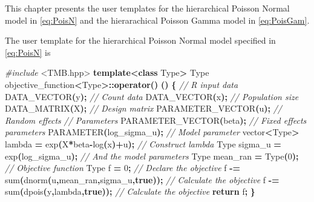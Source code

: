 \documentclass[a4paper,twoside,11pt]{report} %
\newenvironment{Shaded}{\begin{snugshade}}{\end{snugshade}}
\newcommand{\CommentTok}[1]{\textcolor[rgb]{0.56,0.35,0.01}{\textit{#1}}}
\newcommand{\ControlFlowTok}[1]{\textcolor[rgb]{0.13,0.29,0.53}{\textbf{#1}}}
\newcommand{\DecValTok}[1]{\textcolor[rgb]{0.00,0.00,0.81}{#1}}
\newcommand{\ImportTok}[1]{#1}
\newcommand{\KeywordTok}[1]{\textcolor[rgb]{0.13,0.29,0.53}{\textbf{#1}}}
\newcommand{\NormalTok}[1]{#1}
\newcommand{\OperatorTok}[1]{\textcolor[rgb]{0.81,0.36,0.00}{\textbf{#1}}}
\newcommand{\PreprocessorTok}[1]{\textcolor[rgb]{0.56,0.35,0.01}{\textit{#1}}}
\theoremstyle{definition}
\theoremstyle{definition}
\theoremstyle{definition}
\theoremstyle{definition}
\theoremstyle{remark}
\begin{document}
This chapter presents the user templates for the hierarchical Poisson Normal model in \eqref{eq:PoisN} and the hierarachical Poisson Gamma model in \eqref{eq:PoisGam}.

The user template for the hierarchical Poisson Normal model specified in \eqref{eq:PoisN} is

\begin{Shaded}
\begin{Highlighting}[]
\PreprocessorTok{\#include }\ImportTok{\textless{}TMB.hpp\textgreater{}}
\KeywordTok{template}\OperatorTok{\textless{}}\KeywordTok{class}\NormalTok{ Type}\OperatorTok{\textgreater{}}
\NormalTok{Type objective\_function}\OperatorTok{\textless{}}\NormalTok{Type}\OperatorTok{\textgreater{}::}\KeywordTok{operator}\OperatorTok{()} \OperatorTok{()}
\OperatorTok{\{}
  \CommentTok{// R input data}
\NormalTok{  DATA\_VECTOR}\OperatorTok{(}\NormalTok{y}\OperatorTok{);}                               \CommentTok{// Count data}
\NormalTok{  DATA\_VECTOR}\OperatorTok{(}\NormalTok{x}\OperatorTok{);}                               \CommentTok{// Population size}
\NormalTok{  DATA\_MATRIX}\OperatorTok{(}\NormalTok{X}\OperatorTok{);}                               \CommentTok{// Design matrix}
\NormalTok{  PARAMETER\_VECTOR}\OperatorTok{(}\NormalTok{u}\OperatorTok{);}                          \CommentTok{// Random effects}
  \CommentTok{// Parameters}
\NormalTok{  PARAMETER\_VECTOR}\OperatorTok{(}\NormalTok{beta}\OperatorTok{);}                       \CommentTok{// Fixed effects parameters}
\NormalTok{  PARAMETER}\OperatorTok{(}\NormalTok{log\_sigma\_u}\OperatorTok{);}                       \CommentTok{// Model parameter}
\NormalTok{  vector}\OperatorTok{\textless{}}\NormalTok{Type}\OperatorTok{\textgreater{}}\NormalTok{ lambda  }\OperatorTok{=}\NormalTok{ exp}\OperatorTok{(}\NormalTok{X}\OperatorTok{*}\NormalTok{beta}\OperatorTok{{-}}\NormalTok{log}\OperatorTok{(}\NormalTok{x}\OperatorTok{)+}\NormalTok{u}\OperatorTok{);}  \CommentTok{// Construct \textquotesingle{}lambda\textquotesingle{}}
\NormalTok{  Type sigma\_u }\OperatorTok{=}\NormalTok{ exp}\OperatorTok{(}\NormalTok{log\_sigma\_u}\OperatorTok{);}              \CommentTok{// And the model parameters}
\NormalTok{  Type mean\_ran }\OperatorTok{=}\NormalTok{ Type}\OperatorTok{(}\DecValTok{0}\OperatorTok{);}
  \CommentTok{// Objective function}
\NormalTok{  Type f }\OperatorTok{=} \DecValTok{0}\OperatorTok{;}                                   \CommentTok{// Declare the objective}
\NormalTok{  f }\OperatorTok{{-}=}\NormalTok{ sum}\OperatorTok{(}\NormalTok{dnorm}\OperatorTok{(}\NormalTok{u}\OperatorTok{,}\NormalTok{mean\_ran}\OperatorTok{,}\NormalTok{sigma\_u}\OperatorTok{,}\KeywordTok{true}\OperatorTok{));}     \CommentTok{// Calculate the objective}
\NormalTok{  f }\OperatorTok{{-}=}\NormalTok{ sum}\OperatorTok{(}\NormalTok{dpois}\OperatorTok{(}\NormalTok{y}\OperatorTok{,}\NormalTok{lambda}\OperatorTok{,}\KeywordTok{true}\OperatorTok{));}               \CommentTok{// Calculate the objective}
  \ControlFlowTok{return}\NormalTok{ f}\OperatorTok{;}
\OperatorTok{\}}
\end{Highlighting}
\end{Shaded}
\end{document}
